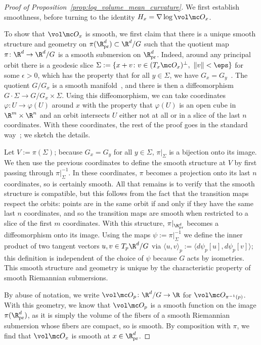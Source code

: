 \documentclass[twoside,a4paper,11pt]{article}
\renewcommand{\phi}{\varphi}
\newcommand{\pr}{\mathrm{pr}}
\theoremstyle{plain}
\begin{document}
\begin{proof}[Proof of Proposition~\ref{prop:log_volume_mean_curvature}]
We first establish smoothness,
before turning to the identity $H_x = \nabla\log \vol \mc O_x$.

To show that $\vol \mc O_x$ is smooth,
we first claim that there is a unique smooth structure and
geometry on $\pi(\R^d_{\pr}) \subset \R^d/G$ such that
the quotient map $\pi \colon \R^d \to \R^d/G$ is a smooth
submersion on $\R^d_\pr$.
Indeed, around any principal orbit there
is a geodesic slice
$\Sigma := \{x + v \colon v \in (T_x\mc O_x)^{\perp},
\, \, \|v\| < \eps \}$
for some $\epsilon > 0$, which
has the property that for all $y \in \Sigma$,
we have $G_x = G_y$~\cite[Section 2.1.6]{berndt2016submanifolds}.
The quotient $G/G_x$ is a smooth manifold~\cite[Theorem 21.17]{lee2013introduction},
and there is then a diffeomorphism $G\cdot \Sigma \to G/G_x \times \Sigma$.
Using this diffeomorphism, we can take coordinates $\phi \colon U \to \phi(U)$ around $x$ with the property
that $\phi(U)$ is an open cube in $\R^m \times \R^n$
and an orbit intersects $U$ either not at all or in a slice of the
last $n$ coordinates.
With these coordinates, the rest of the proof goes
in the standard way~\cite[Theorem 21.20]{lee2013introduction};
we sketch the details.

Let $V:= \pi(\Sigma)$; because $G_x = G_y$
for all $y \in \Sigma$, $\pi|_{\Sigma}$ is a bijection
onto its image. We then use the previous
coordinates to define the
smooth structure at $V$ by first passing through $\pi|_{\Sigma}^{-1}$.
In these coordinates, $\pi$ becomes a projection onto its
last $n$ coordinates, so is certainly smooth.
All that remains is to verify that the smooth structure
is compatible, but this follows from the
fact that the transition maps respect the orbits: points
are in the same orbit if and only if they have the same 
last $n$ coordinates, and so the transition maps
are smooth when restricted to a slice of the first $m$ coordinates.
With this structure, $\pi|_{\R^d_{\pr}}$ becomes a diffeomorphism
onto its image.
Using the maps $\psi:= \pi|_{\Sigma}^{-1}$ we define the
inner product of two tangent vectors $u,v \in T_p\R^d/G$
via $\langle u, v\rangle_p := \langle d\psi_p[u], d\psi_p[v]\rangle$;
this definition is independent of the choice of $\psi$
because $G$ acts by isometries.
This smooth structure and geometry is unique by the characteristic
property of smooth Riemannian submersions.

By abuse of notation, we write $\vol \mc O_p \colon \R^d/G \to \R$ for $\vol \mc O_{\pi^{-1}(p)}$.
With this geometry, we know that $\vol \mc O_p$ is a smooth function
on the image $\pi(\R^d_\pr)$, 
as it is simply the volume of the fibers of a smooth Riemannian
submersion whose fibers are compact, so is smooth.
By composition with $\pi$, we find that $\vol \mc O_x$ is smooth
at $x \in \R^d_{\pr}$.


\end{proof}
\end{document}
